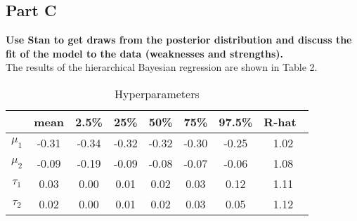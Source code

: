 \documentclass{article}
\begin{document}
\subsection{Part C}
\textbf{Use Stan to get draws from the posterior distribution and discuss the fit of the model to the data (weaknesses and strengths).}\\
The results of the hierarchical Bayesian regression are shown in Table 2. 
\begin{table}[H]
\caption {Hyperparameters}
\vspace{2mm}
\centering \begin{tabular}{c c c c c c c c} 
\hline\hline 
\vspace{1mm}
& mean & 2.5\% &  25\% &  50\% &  75\% & 97.5\% & R-hat\ \\ [0.5ex] 
\hline 
$\mu_1$ & -0.31 & -0.34 & -0.32 & -0.32 & -0.30 & -0.25 & 1.02 \\ 
$\mu_2$ & -0.09 & -0.19 & -0.09 & -0.08 & -0.07 & -0.06 & 1.08 \\
$\tau_1$ & 0.03 & 0.00 & 0.01 & 0.02 & 0.03 & 0.12 & 1.11 \\ 
$\tau_2$ & 0.02 & 0.00 & 0.01 & 0.02 & 0.03 & 0.05 & 1.12 \\ [1ex] \hline 
\end{tabular}
\end{table}
\end{document}
